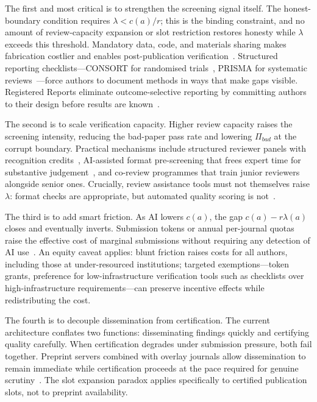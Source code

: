 \documentclass{article}
\begin{document}
The first and most critical is to strengthen the screening signal itself.
The honest-boundary condition requires $\lambda < c(a)/r$; this is the binding constraint, and no amount of review-capacity expansion or slot restriction restores honesty while $\lambda$ exceeds this threshold.
Mandatory data, code, and materials sharing makes fabrication costlier and enables post-publication verification~\citep{Munafo2017, Nosek2015}.
Structured reporting checklists---CONSORT for randomised trials~\citep{Schulz2010}, PRISMA for systematic reviews~\citep{Moher2009}---force authors to document methods in ways that make gaps visible.
Registered Reports eliminate outcome-selective reporting by committing authors to their design before results are known~\citep{Nosek2018}.

The second is to scale verification capacity.
Higher review capacity raises the screening intensity, reducing the bad-paper pass rate and lowering $\Pi_{bad}$ at the corrupt boundary.
Practical mechanisms include structured reviewer panels with recognition credits~\citep{Aczel2021}, AI-assisted format pre-screening that frees expert time for substantive judgement~\citep{Checco2021}, and co-review programmes that train junior reviewers alongside senior ones.
Crucially, review assistance tools must not themselves raise $\lambda$: format checks are appropriate, but automated quality scoring is not~\citep{Naddaf2025}.

The third is to add smart friction.
As AI lowers $c(a)$, the gap $c(a) - r\lambda(a)$ closes and eventually inverts.
Submission tokens or annual per-journal quotas raise the effective cost of marginal submissions without requiring any detection of AI use~\citep{Cotton2013}.
An equity caveat applies: blunt friction raises costs for all authors, including those at under-resourced institutions; targeted exemptions---token grants, preference for low-infrastructure verification tools such as checklists over high-infrastructure requirements---can preserve incentive effects while redistributing the cost.

The fourth is to decouple dissemination from certification.
The current architecture conflates two functions: disseminating findings quickly and certifying quality carefully.
When certification degrades under submission pressure, both fail together.
Preprint servers combined with overlay journals allow dissemination to remain immediate while certification proceeds at the pace required for genuine scrutiny~\citep{Ginsparg2011}.
The slot expansion paradox applies specifically to certified publication slots, not to preprint availability.
\end{document}
